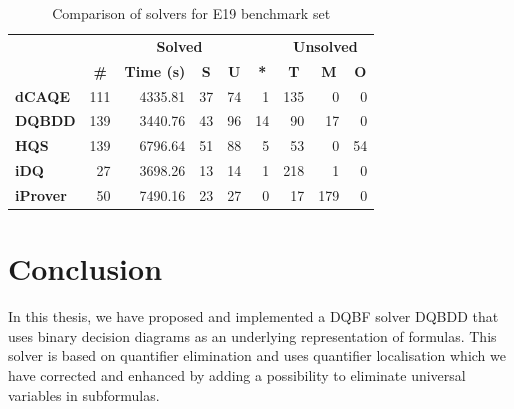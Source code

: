\documentclass[
  digital, %
  color,
  twoside, %
  table,   %
  nolof,     %
  nolot,     %
]{fithesis3}
\theoremstyle{definition}
\theoremstyle{remark}
\begin{document}
\begin{table}[ht]
\centering
\caption{Comparison of solvers for E19 benchmark set}%
\label{tab:E19}
\begin{tabular}{|l|r|r|r|r|r|r|r|r|}
\hline
\multicolumn{1}{|c|}{}                                  & \multicolumn{5}{c|}{\textbf{Solved}}                                                                                                                                        & \multicolumn{3}{c|}{\textbf{Unsolved}}                                                                 \\  \hhline{~*{8}{-}}
\multicolumn{1}{|c|}{\multirow{-2}{*}{\textbf{Solver}}} & \multicolumn{1}{c|}{\textbf{\#}} & \multicolumn{1}{c|}{\textbf{Time (s)}} & \multicolumn{1}{c|}{\textbf{S}} & \multicolumn{1}{c|}{\textbf{U}} & \multicolumn{1}{c|}{\textbf{*}} & \multicolumn{1}{c|}{\textbf{T}} & \multicolumn{1}{c|}{\textbf{M}} & \multicolumn{1}{c|}{\textbf{O}} \\ \hline
\textbf{dCAQE} & \num{111} & \num{4335.81} & \num{37} & \num{74} & \num{1} & \num{135} & \num{0} & \num{0} \\ \hline
\textbf{DQBDD} & \num{139} & \num{3440.76} & \num{43} & \num{96} & \num{14} & \num{90} & \num{17} & \num{0} \\ \hline
\textbf{HQS} & \num{139} & \num{6796.64} & \num{51} & \num{88} & \num{5} & \num{53} & \num{0} & \num{54} \\ \hline
\textbf{iDQ} & \num{27} & \num{3698.26} & \num{13} & \num{14} & \num{1} & \num{218} & \num{1} & \num{0} \\ \hline
\textbf{iProver} & \num{50} & \num{7490.16} & \num{23} & \num{27} & \num{0} & \num{17} & \num{179} & \num{0} \\ \hline
\end{tabular}
\end{table}


\chapter{Conclusion}
In this thesis, we have proposed and implemented a DQBF solver DQBDD that uses binary decision diagrams as an underlying representation of formulas. This solver is based on quantifier elimination and uses quantifier localisation which we have corrected and enhanced by adding a possibility to eliminate universal variables in subformulas.
\end{document}
